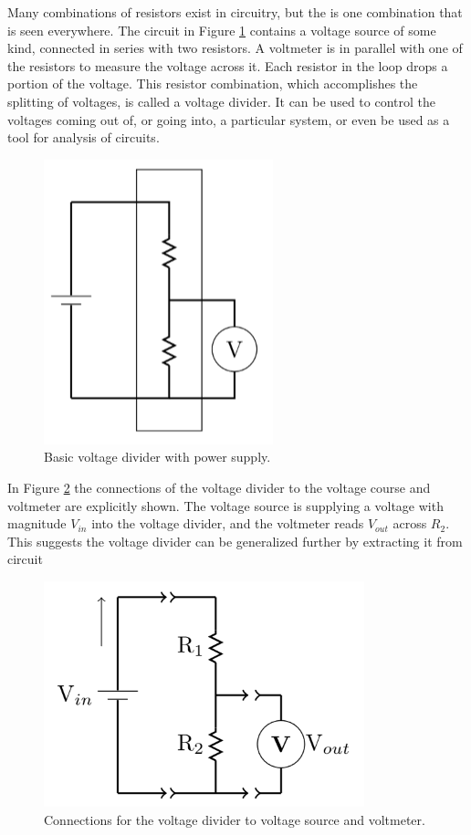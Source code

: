 \documentclass[12pt, a4paper, oneside, openright, titlepage]{book}
\begin{document}
\noindent Many combinations of resistors exist in circuitry, but the  is one combination that is seen everywhere. The circuit in Figure \ref{fig:DC3} contains a voltage source of some kind, connected in series with two resistors. A voltmeter is in parallel with one of the resistors to measure the voltage across it. Each resistor in the loop drops a portion of the voltage. This resistor combination, which accomplishes the splitting of voltages, is called a voltage divider. It can be used to control the voltages coming out of, or going into, a particular system, or even be used as a tool for analysis of circuits.

\begin{figure}[H]
    \centering
    \includegraphics[scale = 0.8]{Images/DC3.PNG}
    \caption{Basic voltage divider with power supply.}
    \label{fig:DC3}
\end{figure}

\noindent In Figure \ref{fig:DC4} the connections of the voltage divider to the voltage course and voltmeter are explicitly shown. The voltage source is supplying a voltage with magnitude $V_{in}$ into the voltage divider, and the voltmeter reads $V_{out}$ across $R_2$. This suggests the voltage divider can be generalized further by extracting it from circuit

\begin{figure}[H]
    \centering
    \includegraphics[scale = 0.8]{Images/DC4.PNG}
    \caption{Connections for the voltage divider to voltage source and voltmeter.}
    \label{fig:DC4}
\end{figure}
\end{document}

